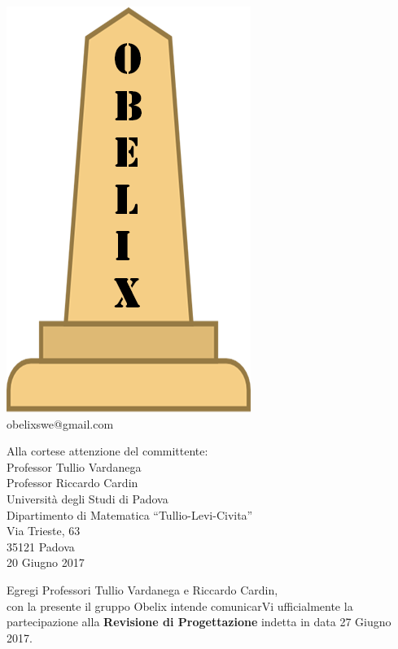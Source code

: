 \documentclass[10 pt,a4paper]{article}
\begin{document}
\begin{minipage}[adjusting]{.3\textwidth}
  \begin{centering}
    \includegraphics[width=.5\textwidth]{../../file_comuni/immagini/obelisk_sample_02.png}
    \\
    obelixswe@gmail.com
  \end{centering}
\end{minipage}


\begin{flushright}
  Alla cortese attenzione del committente: \\
\vspace{0.08in}
  Professor Tullio Vardanega \\
  Professor Riccardo Cardin \\
  Università degli Studi di Padova \\
  Dipartimento di Matematica ``Tullio-Levi-Civita''\\
  Via Trieste, 63 \\
  35121 Padova \\
\vspace{0.08in}
  20 Giugno 2017 \\
\end{flushright}
\vspace{0.1in}
Egregi Professori Tullio Vardanega e Riccardo Cardin,\\
con la presente il gruppo Obelix intende comunicarVi ufficialmente
la partecipazione alla \textbf{Revisione di Progettazione} indetta in
data 27 Giugno 2017.
\vspace{.05in}
\end{document}
